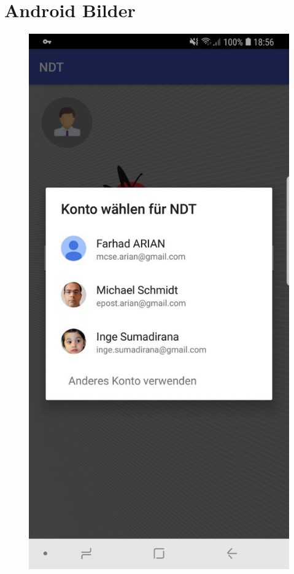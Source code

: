 \section{Android Bilder}
\begin{figure}[htb]  
  \includegraphics[scale=0.2]{img/soft/login.jpeg}

\end{figure}
